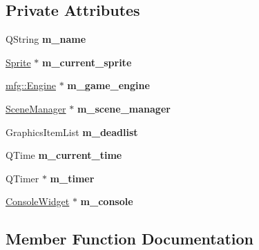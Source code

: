 \subsection*{Private Attributes}
\begin{DoxyCompactItemize}
\item 
\mbox{\label{class_c_tile_scene_a08a8f5f56b6ec92aead51e179b6fed8c}} 
Q\+String {\bfseries m\+\_\+name}
\item 
\mbox{\label{class_c_tile_scene_a8a45d16d8d29220cec9f2de2cd797907}} 
\hyperlink{class_sprite}{Sprite} $\ast$ {\bfseries m\+\_\+current\+\_\+sprite}
\item 
\mbox{\label{class_c_tile_scene_aa5881cbedaf7e2e19863b6c268a1912f}} 
\hyperlink{classmfg_1_1_engine}{mfg\+::\+Engine} $\ast$ {\bfseries m\+\_\+game\+\_\+engine}
\item 
\mbox{\label{class_c_tile_scene_aecceb8c9afaada479dca30b81199a8a6}} 
\hyperlink{class_scene_manager}{Scene\+Manager} $\ast$ {\bfseries m\+\_\+scene\+\_\+manager}
\item 
\mbox{\label{class_c_tile_scene_a384cd8d8692e5d637660b24eaac49849}} 
Graphics\+Item\+List {\bfseries m\+\_\+deadlist}
\item 
\mbox{\label{class_c_tile_scene_a4fe2c6163a5268ef00fac6e002a38d7c}} 
Q\+Time {\bfseries m\+\_\+current\+\_\+time}
\item 
\mbox{\label{class_c_tile_scene_a7a5c6e6553c9bd0e09a63475bf5a476d}} 
Q\+Timer $\ast$ {\bfseries m\+\_\+timer}
\item 
\mbox{\label{class_c_tile_scene_a797b97e5e32f38d441c3298a06edc726}} 
\hyperlink{class_console_widget}{Console\+Widget} $\ast$ {\bfseries m\+\_\+console}
\end{DoxyCompactItemize}


\subsection{Member Function Documentation}
\mbox{\label{class_c_tile_scene_aa1bc804521eaeb9e070c609c3c53f7eb}} 
